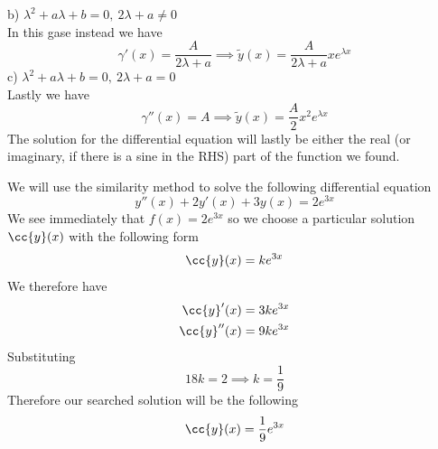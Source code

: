 \documentclass[../mmf.tex]{subfiles}
\begin{document}
\begin{mtd}
	b) $\lambda^2+a\lambda+b=0,\ 2\lambda+a\ne0$\\
	In this gase instead we have
	\begin{equation*}
		\gamma'(x)=\frac{A}{2\lambda+a}\implies{} \tilde{y}(x)=\frac{A}{2\lambda+a}xe^{\lambda x}
	\end{equation*}
	c) $\lambda^2+a\lambda+b=0,\ 2\lambda+a=0$\\
	Lastly we have
	\begin{equation*}
		\gamma''(x)=A\implies{} \tilde{y}(x)=\frac{A}{2}x^2e^{\lambda x}
	\end{equation*}
	The solution for the differential equation will lastly be either the real (or imaginary, if there is a sine in the RHS) part of the function we found.
\end{mtd}
\begin{eg}
	We will use the similarity method to solve the following differential equation
	\begin{equation*}
		y''(x)+2y'(x)+3y(x)=2e^{3x}
	\end{equation*}
	We see immediately that $f(x)=2e^{3x}$ so we choose a particular solution $\cc{y}(x)$ with the following form
	\begin{equation*}
		\cc{y}(x)=ke^{3x}
	\end{equation*}
	We therefore have
	\begin{equation*}
		\begin{aligned}
			\cc{y}'(x)&=3ke^{3x}\\
			\cc{y}''(x)&=9ke^{3x}
		\end{aligned}
	\end{equation*}
	Substituting
	\begin{equation*}
		18k=2\implies{} k=\frac{1}{9}
	\end{equation*}
	Therefore our searched solution will be the following
	\begin{equation*}
		\cc{y}(x)=\frac{1}{9}e^{3x}
	\end{equation*}
\end{eg}
\end{document}
